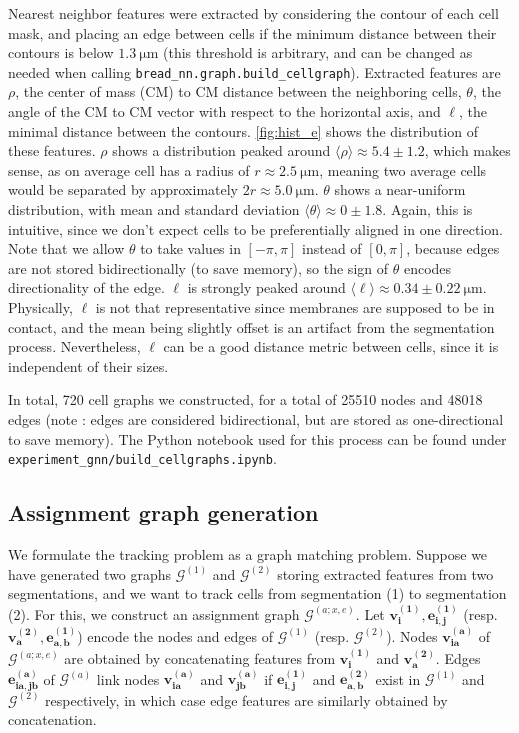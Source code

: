 \documentclass[10pt,conference,compsocconf,a4paper]{IEEEtran}
\newcommand{\G}{\mathcal{G}}
\renewcommand{\vec}[1]{\boldsymbol{#1}}
\newcommand{\nunit}[1]{\ \si{#1}}  %
\newcommand{\avg}[1]{\langle{#1}\rangle}
\newcommand*{\shortautoref}[1]{%
	\begingroup
	\def\equationautorefname{\textsc{Eq.}}%
	\def\tableautorefname{\textsc{Tab.}}%
	\def\figureautorefname{\textsc{Fig.}}%
	\autoref{#1}%
	\endgroup
}
\begin{document}
		Nearest neighbor features were extracted by considering the contour of each cell mask, and placing an edge between cells if the minimum distance between their contours is below $1.3 \nunit{\micro \meter}$ (this threshold is arbitrary, and can be changed as needed when calling \texttt{bread\_nn.graph.build\_cellgraph}). Extracted features are $\rho$, the center of mass (CM) to CM distance between the neighboring cells, $\theta$, the angle of the CM to CM vector with respect to the horizontal axis, and $\ell$, the minimal distance between the contours. \shortautoref{fig:hist_e} shows the distribution of these features. $\rho$ shows a distribution peaked around $\avg{\rho} \approx 5.4 \pm 1.2$, which makes sense, as on average cell has a radius of $r \approx 2.5 \nunit{\micro \meter}$, meaning two average cells would be separated by approximately $2r \approx 5.0 \nunit{\micro \meter}$. $\theta$ shows a near-uniform distribution, with mean and standard deviation $\avg{\theta} \approx 0 \pm 1.8$. Again, this is intuitive, since we don't expect cells to be preferentially aligned in one direction. Note that we allow $\theta$ to take values in $[-\pi, \pi]$ instead of $[0, \pi]$, because edges are not stored bidirectionally (to save memory), so the sign of $\theta$ encodes directionality of the edge. $\ell$ is strongly peaked around $\avg{\ell} \approx 0.34 \pm 0.22 \nunit{\micro \meter}$. Physically, $\ell$ is not that representative since membranes are supposed to be in contact, and the mean being slightly offset is an artifact from the segmentation process. Nevertheless, $\ell$ can be a good distance metric between cells, since it is independent of their sizes.

		In total, 720 cell graphs we constructed, for a total of 25510 nodes and 48018 edges (note : edges are considered bidirectional, but are stored as one-directional to save memory). The Python notebook used for this process can be found under \texttt{experiment\_gnn/build\_cellgraphs.ipynb}.

	\subsection{Assignment graph generation}

		We formulate the tracking problem as a graph matching problem. Suppose we have generated two graphs $\G^{(1)}$ and $\G^{(2)}$ storing extracted features from two segmentations, and we want to track cells from segmentation (1) to segmentation (2). For this, we construct an assignment graph $\G^{(a;x,e)}$. Let $\vec{v_i^{(1)}}, \vec{e_{i,j}^{(1)}}$ (resp. $\vec{v_a^{(2)}}, \vec{e_{a,b}^{(1)}}$) encode the nodes and edges of $\G^{(1)}$ (resp. $\G^{(2)}$). Nodes $\vec{v_{ia}^{(a)}}$ of $\G^{(a;x,e)}$ are obtained by concatenating features from $\vec{v_i^{(1)}}$ and $\vec{v_a^{(2)}}$. Edges $\vec{e_{ia,jb}^{(a)}}$ of $\G^{(a)}$ link nodes $\vec{v_{ia}^{(a)}}$ and $\vec{v_{jb}^{(a)}}$ if $\vec{e_{i,j}^{(1)}}$ and $\vec{e_{a,b}^{(2)}}$ exist in $\G^{(1)}$ and $\G^{(2)}$ respectively, in which case edge features are similarly obtained by concatenation.
\end{document}
